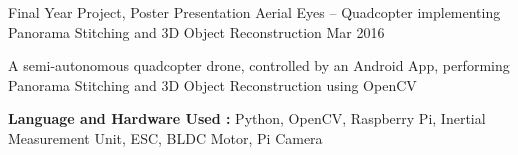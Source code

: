 \begin{cventries}
  \cventry
    {Final Year Project, Poster Presentation} %
    {Aerial Eyes – Quadcopter implementing Panorama Stitching and 3D Object Reconstruction} %
    {} %
    {Mar 2016} %
    {
      \begin{cvitems}
      \item{A semi-autonomous quadcopter drone, controlled by an Android App, performing Panorama Stitching and 3D Object Reconstruction using OpenCV}
      \item{\textbf{Language and Hardware Used :} Python, OpenCV, Raspberry Pi, Inertial Measurement Unit, ESC, BLDC Motor, Pi Camera}
      \end{cvitems}
    }



\end{cventries}

